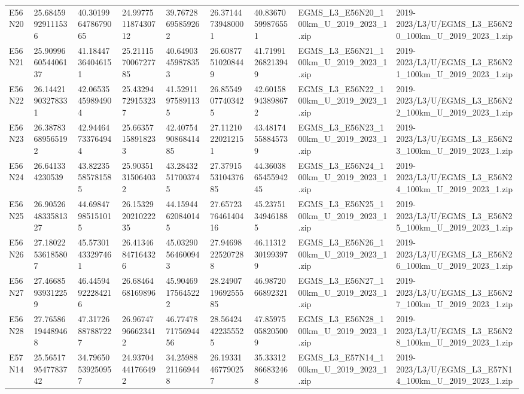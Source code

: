 \begin{landscape}
\begin{longtable}{lllllllll}
E56N20 & 25.68459929111536 & 40.301996478679065 & 24.997751187430712 & 39.76728695859262 & 26.37144739480001 & 40.83670599876551 & EGMS\_L3\_E56N20\_100km\_U\_2019\_2023\_1.zip & 2019-2023/L3/U/EGMS\_L3\_E56N20\_100km\_U\_2019\_2023\_1.zip \\
E56N21 & 25.909966054406137 & 41.18447364046151 & 25.211157006727785 & 40.64903459878353 & 26.60877510208449 & 41.71991268213949 & EGMS\_L3\_E56N21\_100km\_U\_2019\_2023\_1.zip & 2019-2023/L3/U/EGMS\_L3\_E56N21\_100km\_U\_2019\_2023\_1.zip \\
E56N22 & 26.14421903278331 & 42.06535459894904 & 25.43294729153237 & 41.52911975891135 & 26.85549077403425 & 42.60158943898672 & EGMS\_L3\_E56N22\_100km\_U\_2019\_2023\_1.zip & 2019-2023/L3/U/EGMS\_L3\_E56N22\_100km\_U\_2019\_2023\_1.zip \\
E56N23 & 26.38783689565192 & 42.94464733764944 & 25.66357158918233 & 42.407549086841485 & 27.11210220212151 & 43.48174558845739 & EGMS\_L3\_E56N23\_100km\_U\_2019\_2023\_1.zip & 2019-2023/L3/U/EGMS\_L3\_E56N23\_100km\_U\_2019\_2023\_1.zip \\
E56N24 & 26.641334230539 & 43.82235585781585 & 25.90351315064032 & 43.28432517003745 & 27.379155310437685 & 44.360386545594245 & EGMS\_L3\_E56N24\_100km\_U\_2019\_2023\_1.zip & 2019-2023/L3/U/EGMS\_L3\_E56N24\_100km\_U\_2019\_2023\_1.zip \\
E56N25 & 26.905264833581327 & 44.69847985151015 & 26.153292021022235 & 44.15944620840145 & 27.657237646140416 & 45.23751349461885 & EGMS\_L3\_E56N25\_100km\_U\_2019\_2023\_1.zip & 2019-2023/L3/U/EGMS\_L3\_E56N25\_100km\_U\_2019\_2023\_1.zip \\
E56N26 & 27.18022536185807 & 45.57301433297461 & 26.41346847164326 & 45.03290564600943 & 27.94698225207288 & 46.11312301993979 & EGMS\_L3\_E56N26\_100km\_U\_2019\_2023\_1.zip & 2019-2023/L3/U/EGMS\_L3\_E56N26\_100km\_U\_2019\_2023\_1.zip \\
E56N27 & 27.46685939312259 & 46.44594922284216 & 26.6846468169896 & 45.90469175645222 & 28.249071969255585 & 46.9872066892321 & EGMS\_L3\_E56N27\_100km\_U\_2019\_2023\_1.zip & 2019-2023/L3/U/EGMS\_L3\_E56N27\_100km\_U\_2019\_2023\_1.zip \\
E56N28 & 27.76586194489468 & 47.31726887887227 & 26.96747966623412 & 46.774787175694456 & 28.56424422355525 & 47.85975058205009 & EGMS\_L3\_E56N28\_100km\_U\_2019\_2023\_1.zip & 2019-2023/L3/U/EGMS\_L3\_E56N28\_100km\_U\_2019\_2023\_1.zip \\
E57N14 & 25.565179547783742 & 34.79650539250957 & 24.93704441766492 & 34.25988211669448 & 26.19331467790257 & 35.33312866832468 & EGMS\_L3\_E57N14\_100km\_U\_2019\_2023\_1.zip & 2019-2023/L3/U/EGMS\_L3\_E57N14\_100km\_U\_2019\_2023\_1.zip \\

\end{longtable}
\end{landscape}
